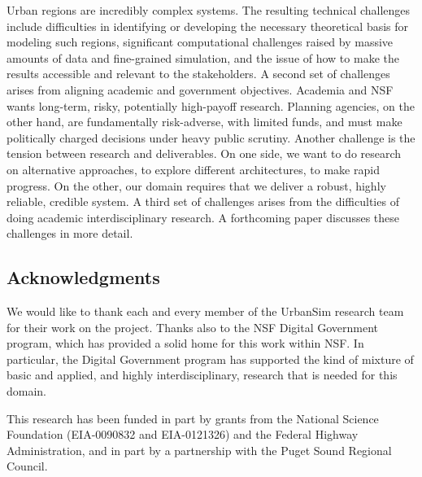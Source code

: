 \documentclass[11pt]{article}
\begin{document}
Urban regions are incredibly complex systems.  The resulting technical
challenges include difficulties in identifying or developing the necessary
theoretical basis for modeling such regions, significant computational
challenges raised by massive amounts of data and fine-grained simulation,
and the issue of how to make the results accessible and relevant to the
stakeholders.  A second set of challenges arises from aligning academic and
government objectives.  Academia and NSF wants long-term, risky,
potentially high-payoff research.  Planning agencies, on the other hand,
are fundamentally risk-adverse, with limited funds, and must make
politically charged decisions under heavy public scrutiny.  Another
challenge is the tension between research and deliverables.  On one side,
we want to do research on alternative approaches, to explore different
architectures, to make rapid progress.  On the other, our domain requires
that we deliver a robust, highly reliable, credible system.  A third set of
challenges arises from the difficulties of doing academic interdisciplinary
research.  A forthcoming paper \cite{waddell-sscr-2004} discusses these
challenges in more detail.

\subsection*{Acknowledgments}

We would like to thank each and every member of the UrbanSim research team
for their work on the project.  Thanks also to the NSF Digital Government
program, which has provided a solid home for this work within NSF.  In
particular, the Digital Government program has supported the kind of
mixture of basic and applied, and highly interdisciplinary, research that
is needed for this domain.

This research has been funded in part by grants from the National Science
Foundation (EIA-0090832 and EIA-0121326) and the Federal Highway
Administration, and in part by a partnership with the Puget Sound Regional
Council.



\end{document}
